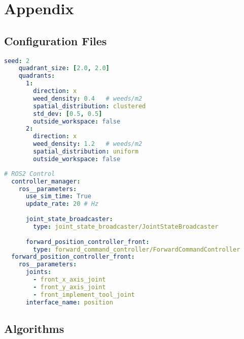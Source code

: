 \chapter{Appendix}\label{sec:appendix}
\section{Configuration Files}

\begin{lstlisting}[language=yaml, frame=tb, caption={Weed Infestation World config example}, label={lst:world-yaml}, float=h]
    seed: 2
    quadrant_size: [2.0, 2.0]
    quadrants:
      1:
        direction: x
        weed_density: 0.4   # weeds/m2
        spatial_distribution: clustered
        std_dev: [0.5, 0.5]
        outside_workspace: false
      2:
        direction: x
        weed_density: 1.2   # weeds/m2
        spatial_distribution: uniform
        outside_workspace: false
\end{lstlisting}

\begin{lstlisting}[language=yaml, frame=tb, caption={ROS$2$ config example}, label={lst:ros2_control-yaml}, float=htb]
  # ROS2 Control
  controller_manager:
    ros__parameters:
      use_sim_time: True
      update_rate: 20 # Hz
  
      joint_state_broadcaster:
        type: joint_state_broadcaster/JointStateBroadcaster
  
      forward_position_controller_front:
        type: forward_command_controller/ForwardCommandController
  forward_position_controller_front:
    ros__parameters:
      joints:
        - front_x_axis_joint
        - front_y_axis_joint
        - front_implement_tool_joint
      interface_name: position
\end{lstlisting}

\clearpage
\section{Algorithms}

